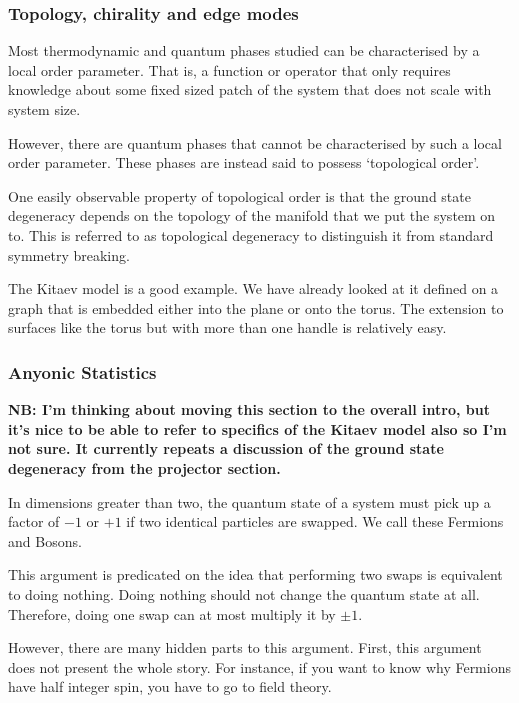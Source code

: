 \hypertarget{topology-chirality-and-edge-modes}{%
\subsubsection{Topology, chirality and edge modes}\label{topology-chirality-and-edge-modes}}

Most thermodynamic and quantum phases studied can be characterised by a local order parameter. That is, a function or operator that only requires knowledge about some fixed sized patch of the system that does not scale with system size.

However, there are quantum phases that cannot be characterised by such a local order parameter. These phases are instead said to possess `topological order'.

One easily observable property of topological order is that the ground state degeneracy depends on the topology of the manifold that we put the system on to. This is referred to as topological degeneracy to distinguish it from standard symmetry breaking.

The Kitaev model is a good example. We have already looked at it defined on a graph that is embedded either into the plane or onto the torus. The extension to surfaces like the torus but with more than one handle is relatively easy.

\hypertarget{anyonic-statistics}{%
\subsubsection{Anyonic Statistics}\label{anyonic-statistics}}

\textbf{NB: I'm thinking about moving this section to the overall intro, but it's nice to be able to refer to specifics of the Kitaev model also so I'm not sure. It currently repeats a discussion of the ground state degeneracy from the projector section.}

In dimensions greater than two, the quantum state of a system must pick up a factor of \(-1\) or \(+1\) if two identical particles are swapped. We call these Fermions and Bosons.

This argument is predicated on the idea that performing two swaps is equivalent to doing nothing. Doing nothing should not change the quantum state at all. Therefore, doing one swap can at most multiply it by \(\pm 1\).

However, there are many hidden parts to this argument. First, this argument does not present the whole story. For instance, if you want to know why Fermions have half integer spin, you have to go to field theory.

